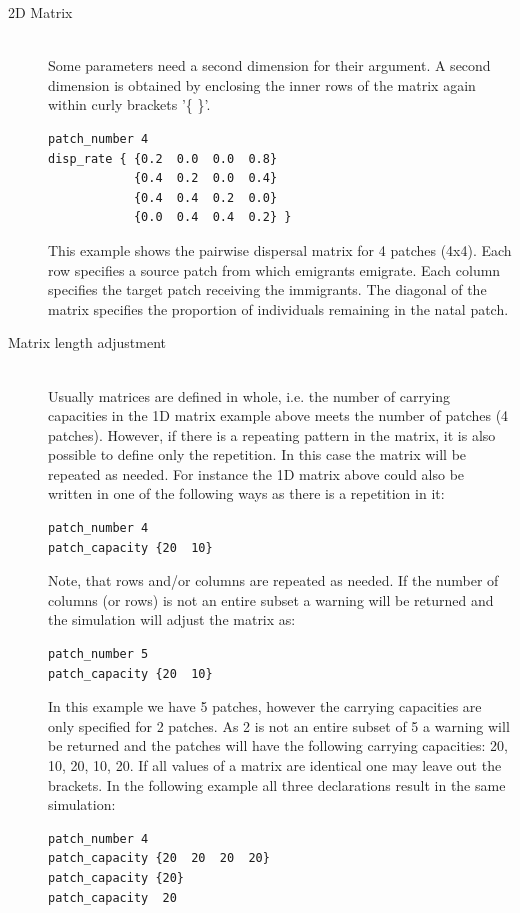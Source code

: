 \documentclass[letterpaper,12pt,oneside]{book}
\begin{document}
\begin{description}
\begin{description}
\item[2D Matrix]\hspace*{\fill}\\
Some parameters need a second dimension for their argument. A second dimension is obtained by enclosing the inner rows of the matrix again within curly brackets '\{ \}'.
\begin{lstlisting}[frame=single]
patch_number 4
disp_rate { {0.2  0.0  0.0  0.8}
            {0.4  0.2  0.0  0.4}
            {0.4  0.4  0.2  0.0}
            {0.0  0.4  0.4  0.2} }
\end{lstlisting}
This example shows the pairwise dispersal matrix for 4 patches (4x4). Each row specifies a source patch from which emigrants emigrate. Each column specifies the target patch receiving the immigrants. The diagonal of the matrix specifies the proportion of individuals remaining in the natal patch.

\item[Matrix length adjustment]\hspace*{\fill}\\
Usually matrices are defined in whole, i.e. the number of carrying capacities in the 1D matrix example above meets the number of patches (4 patches). However, if there is a repeating pattern in the matrix, it is also possible to define only the repetition. In this case the matrix will be repeated as needed. For instance the 1D matrix above could also be written in one of the following ways as there is a repetition in it: 
\begin{lstlisting}[frame=single]
patch_number 4
patch_capacity {20  10}
\end{lstlisting}
Note, that rows and/or columns are repeated as needed. If the number of columns (or rows) is not an entire subset a warning will be returned and the simulation will adjust the matrix as:
\begin{lstlisting}[frame=single]
patch_number 5
patch_capacity {20  10}
\end{lstlisting}
In this example we have 5 patches, however the carrying capacities are only specified for 2 patches. As 2 is not an entire subset of 5 a warning will be returned and the patches will have the following carrying capacities: 20, 10, 20, 10, 20. If all values of a matrix are identical one may leave out the brackets. In the following example all three declarations result in the same simulation:
\begin{lstlisting}[frame=single]
patch_number 4
patch_capacity {20  20  20  20}
patch_capacity {20}
patch_capacity  20
\end{lstlisting}



\end{description}
\end{description}
\end{document}
